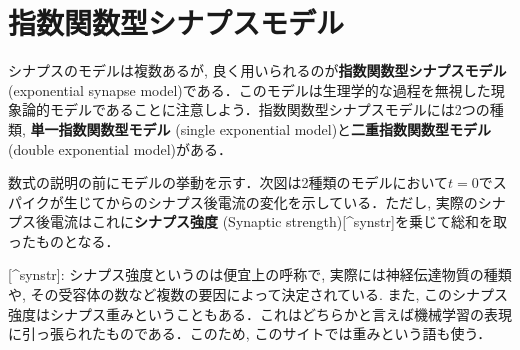 \section{指数関数型シナプスモデル}
シナプスのモデルは複数あるが, 良く用いられるのが\textbf{指数関数型シナプスモデル}(exponential synapse model)である．このモデルは生理学的な過程を無視した現象論的モデルであることに注意しよう．指数関数型シナプスモデルには2つの種類, \textbf{単一指数関数型モデル} (single exponential model)と\textbf{二重指数関数型モデル} (double exponential model)がある．

数式の説明の前にモデルの挙動を示す．次図は2種類のモデルにおいて$t=0$でスパイクが生じてからのシナプス後電流の変化を示している．ただし, 実際のシナプス後電流はこれに\textbf{シナプス強度} (Synaptic strength)[^synstr]を乗じて総和を取ったものとなる．

[^synstr]: シナプス強度というのは便宜上の呼称で, 実際には神経伝達物質の種類や, その受容体の数など複数の要因によって決定されている. また, このシナプス強度はシナプス重みということもある．これはどちらかと言えば機械学習の表現に引っ張られたものである．このため, このサイトでは重みという語も使う．
